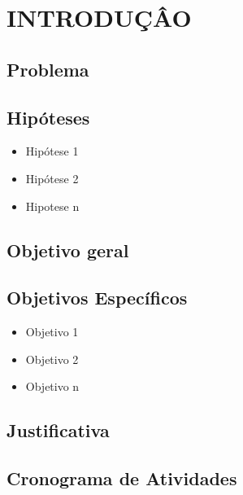 \chapter{INTRODUÇÂO}

\lipsum[2-10]

\section{Problema}

\lipsum[3-5]

\section{Hipóteses}

\lipsum[5]
\begin{itemize}
    \item Hipótese 1
    \item Hipótese 2
    \item Hipotese n
\end{itemize}

\section{Objetivo geral}

\lipsum[6]

\section{Objetivos Específicos}

\lipsum[7]
\begin{itemize}
    \item Objetivo 1
    \item Objetivo 2
    \item Objetivo n
\end{itemize}

\section{Justificativa}

\lipsum[7-20]

\section{Cronograma de Atividades}
